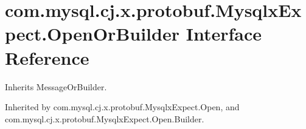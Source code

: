 \hypertarget{interfacecom_1_1mysql_1_1cj_1_1x_1_1protobuf_1_1_mysqlx_expect_1_1_open_or_builder}{}\section{com.\+mysql.\+cj.\+x.\+protobuf.\+Mysqlx\+Expect.\+Open\+Or\+Builder Interface Reference}
\label{interfacecom_1_1mysql_1_1cj_1_1x_1_1protobuf_1_1_mysqlx_expect_1_1_open_or_builder}


Inherits Message\+Or\+Builder.



Inherited by com.\+mysql.\+cj.\+x.\+protobuf.\+Mysqlx\+Expect.\+Open, and com.\+mysql.\+cj.\+x.\+protobuf.\+Mysqlx\+Expect.\+Open.\+Builder.

